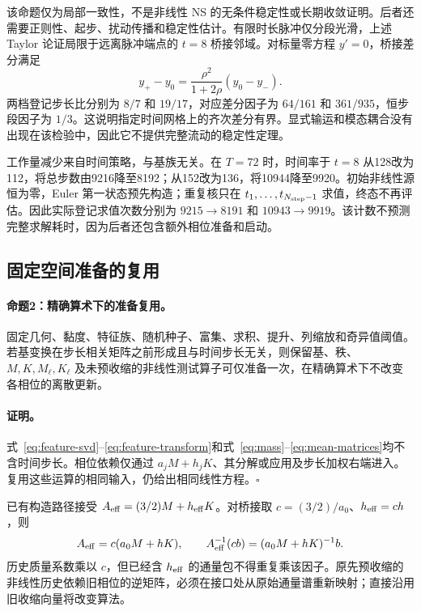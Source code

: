 该命题仅为局部一致性，不是非线性 NS 的无条件稳定性或长期收敛证明。后者还需要正则性、起步、扰动传播和稳定性估计。有限时长脉冲仅分段光滑，上述 Taylor 论证局限于远离脉冲端点的 \(t=8\) 桥接邻域。对标量零方程 \(y'=0\)，桥接差分满足
\begin{equation}
 y_+-y_0=\frac{\rho^2}{1+2\rho}(y_0-y_-).
 \label{eq:zero-equation}
\end{equation}
两档登记步长比分别为 \(8/7\) 和 \(19/17\)，对应差分因子为 \(64/161\) 和 \(361/935\)，恒步段因子为 \(1/3\)。这说明指定时间网格上的齐次差分有界。显式输运和模态耦合没有出现在该检验中，因此它不提供完整流动的稳定性定理。

工作量减少来自时间策略，与基族无关。在 \(T=72\) 时，时间率于 \(t=8\) 从128改为112，将总步数由9216降至8192；从152改为136，将10944降至9920。初始非线性源恒为零，Euler 第一状态预先构造；重复核只在 $t_1,\ldots,t_{N_{\rm step}-1}$ 求值，终态不再评估。因此实际登记求值次数分别为 \(9215\to8191\) 和 \(10943\to9919\)。该计数不预测完整求解耗时，因为后者还包含额外相位准备和启动。

\subsection{固定空间准备的复用}

\paragraph{命题2：精确算术下的准备复用。}
固定几何、黏度、特征族、随机种子、富集、求积、提升、列缩放和奇异值阈值。若基变换在步长相关矩阵之前形成且与时间步长无关，则保留基、秩、\(M,K,M_\ell,K_\ell\) 及未预收缩的非线性测试算子可仅准备一次，在精确算术下不改变各相位的离散更新。

\paragraph{证明。}
式~\eqref{eq:feature-svd}--\eqref{eq:feature-transform}和式~\eqref{eq:mass}--\eqref{eq:mean-matrices}均不含时间步长。相位依赖仅通过 \(a_jM+h_jK\)、其分解或应用及步长加权右端进入。复用这些运算的相同输入，仍给出相同线性方程。\hfill\(\square\)

已有构造路径接受 \(A_{\rm eff}=(3/2)M+h_{\rm eff}K\)。对桥接取 \(c=(3/2)/a_0\)、\(h_{\rm eff}=ch\)，则
\begin{equation}
 A_{\rm eff}=c(a_0M+hK),\qquad
 A_{\rm eff}^{-1}(cb)=(a_0M+hK)^{-1}b.
 \label{eq:bridge-reuse}
\end{equation}
历史质量系数乘以 \(c\)，但已经含 \(h_{\rm eff}\) 的通量包不得重复乘该因子。原先预收缩的非线性历史依赖旧相位的逆矩阵，必须在接口处从原始通量谱重新映射；直接沿用旧收缩向量将改变算法。

